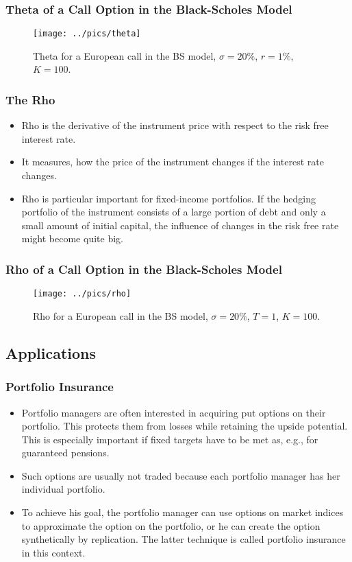 \begin{frame}[fragile]
\frametitle{Theta of a Call Option in the Black-Scholes Model}
\begin{figure}[htp]
\begin{center}
  \texttt{[image: ../pics/theta]}
  \caption{Theta for a European call in the BS model, $\sigma=20\%$, $r=1\%$,
  $K=100$.}
  \label{fig:thetaBS}
\end{center}
\end{figure}
\end{frame}

\begin{frame}[fragile]
\frametitle{The Rho}
\begin{itemize}
  \item Rho is the derivative of the instrument price with respect to the risk
  free interest rate.
  \item It measures, how the price of the instrument changes if the interest
  rate changes.
  \item Rho is particular important for fixed-income portfolios. If the hedging
  portfolio of the instrument consists of a large portion of debt and only a
  small amount of initial capital, the influence of changes in the risk free
  rate might become quite big.
\end{itemize}
\end{frame}

\begin{frame}[fragile]
\frametitle{Rho of a Call Option in the Black-Scholes Model}
\begin{figure}[htp]
\begin{center}
  \texttt{[image: ../pics/rho]}
  \caption{Rho for a European call in the BS model, $\sigma=20\%$, $T=1$,
  $K=100$.}
  \label{fig:rhoBS}
\end{center}
\end{figure}
\end{frame}

\subsection{Applications}

\begin{frame}[fragile]
\frametitle{Portfolio Insurance}
\begin{itemize}
  \item Portfolio managers are often interested in acquiring put options on
  their portfolio. This protects them from losses while retaining the upside
  potential. This is especially important if fixed targets have to be met as,
  e.g., for guaranteed pensions.
  \item Such options are usually not traded because each portfolio manager has
  her individual portfolio.
  \item To achieve his goal, the portfolio manager can use options on market
  indices to approximate the option on the portfolio, or he can create the
  option synthetically by replication. The latter technique is called portfolio
  insurance in this context.
\end{itemize}
\end{frame}

